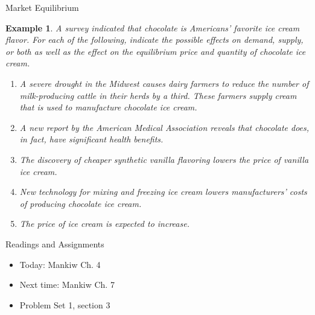 \documentclass[xcolor={dvipsnames},pdf, hyperref={colorlinks=true, citecolor=ForestGreen, linkcolor=BlueViolet, urlcolor=Magenta}]{beamer}
\newtheorem{exmp}{Example}[section]
\theoremstyle{definition}
\begin{document}
\begin{frame}{Market Equilibrium}
	\scriptsize
	\begin{exmp} A survey indicated that chocolate is Americans' favorite ice cream flavor. For each of the following, indicate the possible effects on demand, supply, or both as well as the effect on the equilibrium price and quantity of chocolate ice cream.
		\begin{enumerate}
			
			
			\item A severe drought in the Midwest causes dairy farmers to reduce the number of milk-producing cattle in their herds by a third. These farmers supply cream that is used to manufacture chocolate ice cream.
			
			\item A new report by the American Medical Association reveals that chocolate does, in fact, have significant health benefits.
			
			
			\item The discovery of cheaper synthetic vanilla flavoring lowers the price of vanilla ice cream.
			
			\item New technology for mixing and freezing ice cream lowers manufacturers' costs of producing chocolate ice cream.
			
			\item The price of ice cream is expected to increase.
			
			
			
		\end{enumerate}
	\end{exmp}
\end{frame}

\begin{frame}{Readings and Assignments}
	\begin{itemize}
		\item Today: Mankiw Ch. 4
		\item Next time: Mankiw Ch. 7
		\item Problem Set 1, section 3
	\end{itemize}
\end{frame}
\end{document}
